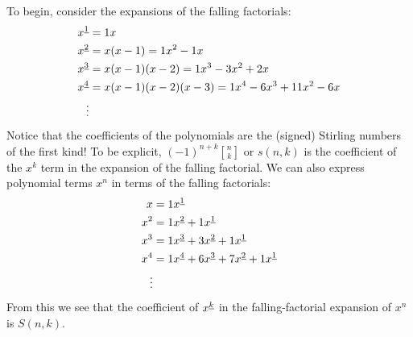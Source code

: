 \documentclass[11pt,twosided]{article}
\newcommand{\stirlingone}[2]{\genfrac[]{0pt}{1}{#1}{#2}}
\begin{document}
To begin, consider the expansions of the falling factorials: 
\begin{align*}
	{x}^{\underline{1}} &= 1x \\
	{x}^{\underline{2}} &= x(x-1) = 1x^2 - 1x\\
	{x}^{\underline{3}} &= x(x-1)(x-2) = 1x^3 - 3x^2 + 2x \\
	{x}^{\underline{4}} &= x(x-1)(x-2)(x-3) = 1x^4 - 6x^3 + 11x^2 - 6x \\
	\vdots 
\end{align*}
Notice that the coefficients of the polynomials are the (signed) Stirling numbers of the first kind! To be explicit, $(-1)^{n+k}\stirlingone{n}{k}$ or $s(n, k)$ is the coefficient of the $x^{k}$ term in the expansion of the falling factorial. 
We can also express polynomial terms $x^n$ in terms of the falling factorials:
\begin{align*}
	x &= 1 {x}^{\underline{1}} \\
	x^2 &= 1 {x}^{\underline{2}} + 1 {x}^{\underline{1}} \\
	x^3 &= 1 {x}^{\underline{3}} + 3 {x}^{\underline{2}} + 1 {x}^{\underline{1}} \\
	x^4 &= 1 {x}^{\underline{4}} + 6 {x}^{\underline{3}} + 7 {x}^{\underline{2}} + 1 {x}^{\underline{1}} \\
	\vdots
\end{align*}
From this we see that the coefficient of ${x}^{\underline{k}}$ in the falling-factorial expansion of $x^n$ is $S(n, k)$.
\end{document}
